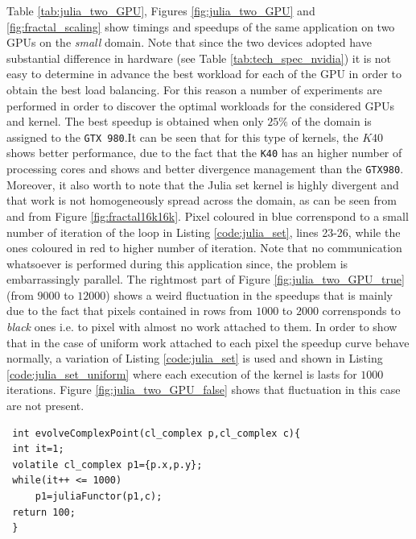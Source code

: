 Table \ref{tab:julia_two_GPU}, Figures \ref{fig:julia_two_GPU} and \ref{fig:fractal_scaling} show timings and speedups of the same application on two GPUs on the \textit{small} domain. Note that since the two devices adopted have substantial difference in hardware (see Table \ref{tab:tech_spec_nvidia}) it is not easy to determine in advance the best workload for each of the GPU in order to obtain the best load balancing. For this reason a number of experiments are performed in order to discover the optimal workloads for the considered GPUs and kernel.
The best speedup is obtained when only $25\%$ of the domain is assigned to the \texttt{GTX 980}.It can be seen that for this type of kernels, the $K40$ shows better performance, due to the fact that the \texttt{K40} has an higher number of processing cores and shows and better divergence management than the \texttt{GTX980}.
Moreover, it also worth to note that the Julia set kernel is highly divergent and that work is not homogeneously spread across the domain, as can be seen from  and from Figure \ref{fig:fractal16k16k}. Pixel coloured in blue correnspond to a small number of iteration of the loop in Listing \ref{code:julia_set}, lines 23-26, while the ones coloured in red to higher number of iteration.
Note that no communication whatsoever is performed during this application since, the problem is embarrassingly parallel.
The rightmost part of Figure \ref{fig:julia_two_GPU_true} (from $9000$ to $12000$) shows a weird fluctuation in the speedups that is mainly due to the fact that pixels contained in rows from $1000$ to $2000$ corrensponds to \textit{black} ones i.e. to pixel with almost no work attached to them.
In order to show that in the case of uniform work attached to each pixel the speedup curve behave normally, a variation of Listing \ref{code:julia_set} is used and shown in Listing \ref{code:julia_set_uniform} where each execution of the kernel is lasts for $1000$ iterations.
Figure \ref{fig:julia_two_GPU_false} shows that fluctuation in this case are not present.
\begin{minipage}{\linewidth}
 \begin{lstlisting}
 int evolveComplexPoint(cl_complex p,cl_complex c){
 int it=1;
 volatile cl_complex p1={p.x,p.y};
 while(it++ <= 1000)
	 p1=juliaFunctor(p1,c);
 return 100;
 }
 \end{lstlisting}
\end{minipage}
 
